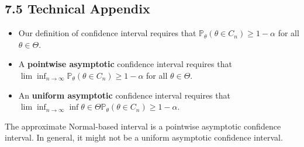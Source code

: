 \subsection{7.5 Technical Appendix}\label{technical-appendix}

\begin{itemize}[tightlist]
\item
  Our definition of confidence interval requires that
  \(\mathbb{P}_\theta(\theta \in C_n) \geq 1 - \alpha\) for all
  \(\theta \in \Theta\).
\item
  A \textbf{pointwise asymptotic} confidence interval requires that
  \(\lim \inf_{n \rightarrow \infty} \mathbb{P}_\theta(\theta \in C_n) \geq 1 - \alpha\)
  for all \(\theta \in \Theta\).
\item
  An \textbf{uniform asymptotic} confidence interval requires that
  \(\lim \inf_{n \rightarrow \infty} \inf{\theta \in \Theta} \mathbb{P}_\theta(\theta \in C_n) \geq 1 - \alpha\).
\end{itemize}

The approximate Normal-based interval is a pointwise asymptotic
confidence interval. In general, it might not be a uniform asymptotic
confidence interval.

